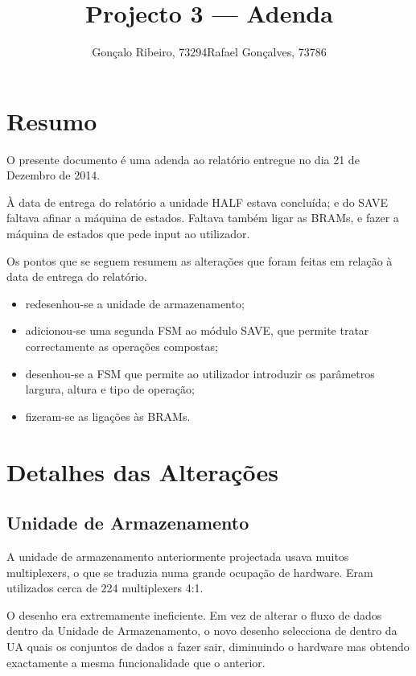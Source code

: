 \documentclass[a4paper]{article}
\title{Projecto 3 --- Adenda}
\author{Gonçalo Ribeiro, 73294\hspace{8mm}Rafael Gonçalves, 73786}
\begin{document}
\maketitle
%


\section{Resumo}
O presente documento é uma adenda ao relatório entregue no dia 21 de Dezembro de 2014.

À data de entrega do relatório a unidade HALF estava concluída; e do SAVE faltava afinar a máquina de estados. Faltava também ligar as BRAMs, e fazer a máquina de estados que pede input ao utilizador.

Os pontos que se seguem resumem as alterações que foram feitas em relação à data de entrega do relatório.

\begin{itemize}
	\item redesenhou-se a unidade de armazenamento;
	\item adicionou-se uma segunda FSM ao módulo SAVE, que permite tratar correctamente as operações compostas;
	\item desenhou-se a FSM que permite ao utilizador introduzir os parâmetros largura, altura e tipo de operação;
	\item fizeram-se as ligações às BRAMs.
\end{itemize}

\section{Detalhes das Alterações}

\subsection*{Unidade de Armazenamento}

A unidade de armazenamento anteriormente projectada usava muitos multiplexers, o que se traduzia numa grande ocupação de hardware. Eram utilizados cerca de 224 multiplexers 4:1.

O desenho era extremamente ineficiente. Em vez de alterar o fluxo de dados dentro da Unidade de Armazenamento, o novo desenho selecciona de dentro da UA quais os conjuntos de dados a fazer sair, diminuindo o hardware mas obtendo exactamente a mesma funcionalidade que o anterior.
\end{document}
